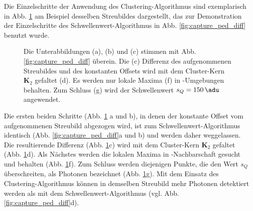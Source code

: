 \noindent
Die Einzelschritte der Anwendung des Clustering-Algorithmus sind exemplarisch in Abb. \ref{fig:capture_ped_diff_clustering} am Beispiel desselben Streubildes dargestellt, das zur Demonstration der Einzelschritte des Schwellen\-wert-Algorithmus in Abb. \ref{fig:capture_ped_diff} benutzt wurde.
\begin{figure}[H]
    \centering
    
    \caption{Die Unterabbildungen (a), (b) und (c) stimmen mit Abb. \ref{fig:capture_ped_diff} überein. Die (c) Differenz des aufgenommenen Streubildes und des konstanten Offsets wird mit dem Cluster-Kern $\mathbf{K}_2$ gefaltet (d). Es werden nur lokale Maxima (f) in -Umgebungen behalten. Zum Schluss (g) wird der Schwellenwert $s_Q = \SI{150}{\adu}$ angewendet.}
    \label{fig:capture_ped_diff_clustering}
\end{figure}
\noindent
Die ersten beiden Schritte (Abb. \ref{fig:capture_ped_diff_clustering} a und b), in denen der konstante Offset vom aufgenommenen Streubild abgezogen wird, ist zum Schwellenwert-Algorithmus identisch (Abb. \ref{fig:capture_ped_diff}a und b) und werden daher weggelassen. Die resultierende Differenz (Abb. \ref{fig:capture_ped_diff_clustering}c) wird mit dem Cluster-Kern  $\mathbf{K}_2$ gefaltet (Abb. \ref{fig:capture_ped_diff_clustering}d). Als Nächstes werden die lokalen Maxima in -Nachbarschaft gesucht und behalten (Abb. \ref{fig:capture_ped_diff_clustering}f). Zum Schluss werden diejenigen Punkte, die den Wert $s_Q$ überschreiten, als Photonen bezeichnet (Abb. \ref{fig:capture_ped_diff_clustering}g). Mit dem Einsatz des Clustering-Algorithmus können in demselben Streubild mehr Photonen detektiert werden als mit dem Schwellenwert-Algorithmus (vgl. Abb. \ref{fig:capture_ped_diff}d).


